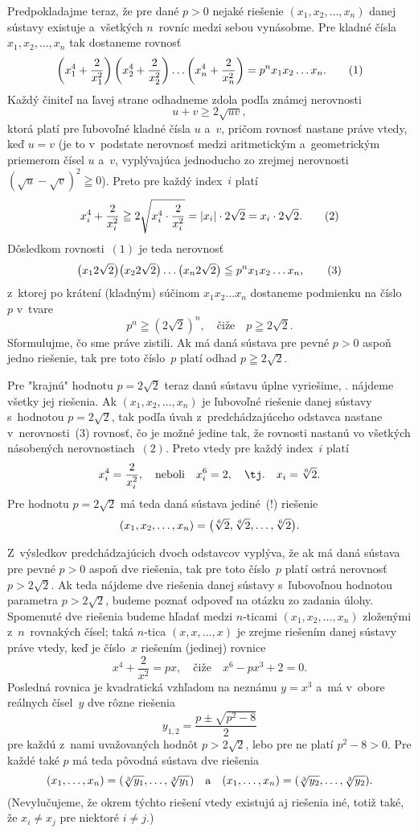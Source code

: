 {Predpokladajme teraz, že pre dané $p>0$ nejaké riešenie
$(x_1,x_2,\dots,x_n)$ danej sústavy existuje a~všetkých $n$~rovníc
medzi sebou vynásobme. Pre kladné čísla $x_1,x_2,\dots,x_n$ tak
dostaneme rovnosť
$$
\left(x_{1}^4+\frac{2}{x_{1}^2}\right)
\left(x_{2}^4+\frac{2}{x_{2}^2}\right)\dots
\left(x_{n}^4+\frac{2}{x_{n}^2}\right)=
p^nx_1x_2\dots x_n.
\tag1
$$
Každý činiteľ na ľavej strane odhadneme zdola podľa známej
nerovnosti
$$
u+v\geq2\sqrt{uv},
$$
ktorá platí pre ľubovoľné kladné čísla $u$ a~$v$, pričom rovnosť
nastane práve vtedy, keď $u=v$ (je to v~podstate nerovnosť medzi
aritmetickým a~geometrickým priemerom čísel $u$ a~$v$, vyplývajúca
jednoducho zo zrejmej nerovnosti
$(\sqrt{u}-\sqrt{v})^2\geqq0$). Preto pre každý index~$i$ platí
$$
x_{i}^4+\frac{2}{x_{i}^2}\geqq2\sqrt{x_{i}^4\cdot\frac{2}{x_{i}^2}}
=|x_i|\cdot2\sqrt2=x_i\cdot2\sqrt2.
\tag2
$$
Dôsledkom rovnosti~$(1)$ je teda nerovnosť
$$
\bigl(x_1 2\sqrt2\bigr)\bigl(x_2 2\sqrt2\bigr)\dots\bigl(x_n 2\sqrt2\bigr)
\leqq p^nx_1x_2\dots x_n,
\tag3
$$
z~ktorej po krátení (kladným) súčinom $x_1x_2\dots x_n$
dostaneme podmienku na číslo~$p$ v~tvare
$$
p^n\geqq(2\sqrt2)^n,\quad\text{čiže}\quad p\geqq2\sqrt2.
$$
Sformulujme, čo sme práve zistili. Ak má daná sústava pre
pevné $p>0$ aspoň jedno riešenie, tak pre toto číslo~$p$ platí
odhad $p\geqq2\sqrt2$.

Pre "krajnú" hodnotu $p=2\sqrt2$ teraz danú sústavu
úplne vyriešime, \tj. nájdeme všetky jej riešenia. Ak
$(x_1,x_2,\dots,x_n)$ je ľubovoľné riešenie danej sústavy s~hodnotou
$p=2\sqrt2$, tak podľa úvah z~predchádzajúceho odstavca nastane
v~nerovnosti~(3) rovnosť, čo je možné jedine tak, že rovnosti
nastanú vo všetkých násobených nerovnostiach~$(2)$. Preto vtedy pre
každý index~$i$ platí
$$
x_{i}^4=\frac{2}{x_{i}^2},\quad\text{neboli}\quad
x_{i}^6=2,\quad\text{\tj.}\quad
x_{i}=\root{6}\of{2}.
$$
Pre hodnotu $p=2\sqrt2$ má teda daná sústava jediné~(!) riešenie
$$
(x_1,x_2,\dots,x_n)=
\bigl(\root{6}\of{2},\root{6}\of{2},\dots,\root{6}\of{2}\bigr).
$$

Z~výsledkov predchádzajúcich dvoch odstavcov vyplýva, že ak má daná
sústava pre pevné $p>0$ aspoň dve riešenia, tak pre toto číslo~$p$
platí ostrá nerovnosť $p>2\sqrt2$. Ak teda nájdeme dve
riešenia danej sústavy s~ľubovoľnou hodnotou parametra
$p>2\sqrt2$, budeme poznať odpoveď na otázku zo zadania úlohy.
Spomenuté dve riešenia budeme hľadať medzi $n$-ticami
$(x_1,x_2,\dots,x_n)$ zloženými z~$n$~rovnakých čísel; taká
\hbox{$n$-tica} $(x,x,\dots,x)$ je zrejme riešením danej sústavy práve vtedy,
keď je číslo~$x$ riešením (jedinej) rovnice
$$
x^4+\frac{2}{x^2}=px,\quad\text{čiže}\quad
x^6-px^3+2=0.
$$
Posledná rovnica je kvadratická vzhľadom na neznámu $y=x^3$ a~má
v~obore reálnych čísel~$y$ dve rôzne riešenia
$$
y_{1,2}=\frac{p\pm\sqrt{p^2-8}}{2}
$$
pre každú z~nami uvažovaných hodnôt $p>2\sqrt2$, lebo pre ne
platí $p^2-8>0$. Pre každé také $p$ má teda pôvodná sústava
dve riešenia
$$
(x_1,\dots,x_n)=(\root{3}\of{y_1},\dots,\root{3}\of{y_1})\quad\text{a}
\quad(x_1,\dots,x_n)=(\root{3}\of{y_2},\dots,\root{3}\of{y_2}).
$$
(Nevylučujeme, že okrem týchto riešení vtedy existujú aj riešenia
iné, totiž také, že $x_i\ne x_j$ pre niektoré $i\ne j$.)

}
